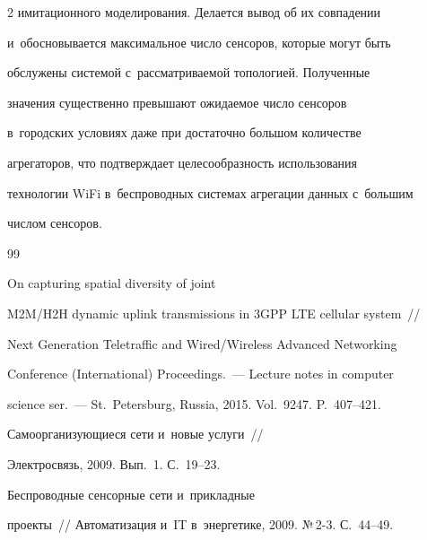 \begin{multicols}{2}
имитационного моделирования. Делается вывод об их совпадении 


и~обосновывается максимальное число сенсоров, которые могут быть 


обслужены системой с~рас\-смат\-ри\-ва\-емой топологией. Полученные 


значения существенно превышают ожидаемое число сенсоров 


в~городских условиях даже при достаточно большом количестве 


агрегаторов, что подтверждает целесообразность использования 


технологии WiFi в~беспроводных системах агрегации данных с~большим 


числом сенсоров.











{\small\frenchspacing


 {%




 \begin{thebibliography}{99}







 On capturing spatial diversity of joint 


M2M/H2H dynamic uplink transmissions in 3GPP LTE cellular system~// 


Next Generation Teletraffic and Wired/Wireless Advanced Networking 


Conference (International) Proceedings.~---  Lecture notes in computer 


science ser.~--- St.\ Petersburg, Russia, 2015. Vol.~9247. P.~407--421.




 Самоорганизующиеся сети и~новые услуги~// 


Электросвязь, 2009. Вып.~1. С.~19--23.




 Беспроводные сенсорные сети и~прикладные 


проекты~// Автоматизация и~IT в~энергетике, 2009. №\,2-3. С.~44--49.



\end{thebibliography}}}
\end{multicols}
